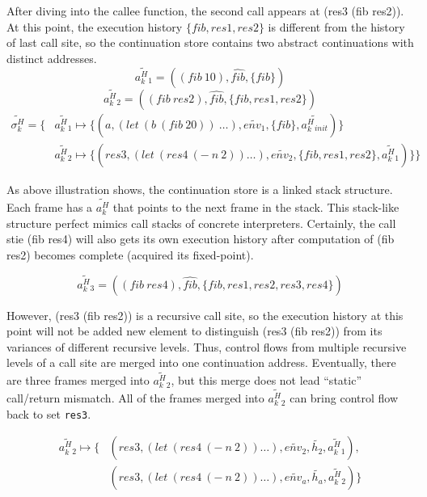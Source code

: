 \documentclass{article}
\begin{document}
After diving into the callee function, the second call appears at (res3 (fib res2)). At this point, the execution history $\{fib, res1, res2\}$ is different from the history of last call site, so the continuation store contains two abstract continuations with distinct addresses.
\[
\widetilde{a^H_k{}_1} = ((fib\ 10), \widehat{fib}, \{fib\})
\]
\[
\widetilde{a^H_k{}_2} = ((fib\ res2), \widehat{fib}, \{fib, res1, res2\})
\]
\[
\begin{aligned}
\label{eq:show-stack}
\widetilde{\sigma_k^H} = \{ {}& \widetilde{a^H_k{}_1} \mapsto \{(a, (let\ (b\ (fib\ 20))\ \dots), \widetilde{env_1}, \{fib\}, \widetilde{a^H_k{}_{init}})\}  {} \\
                              & \widetilde{a^H_k{}_2} \mapsto \{(res3, (let\ (res4\ (-\ n\ 2)) \dots), \widetilde{env_2}, \{fib, res1, res2\}, \widetilde{a^H_k{}_1})\} \}
\end{aligned}
\]

As above illustration shows, the continuation store is a linked stack structure. Each frame has a $\widetilde{a^H_k}$ that points to the next frame in the stack. This stack-like structure perfect mimics call stacks of concrete interpreters. Certainly, the call stie (fib res4) will also gets its own execution history after computation of (fib res2) becomes complete (acquired its fixed-point).

\[
\widetilde{a^H_k{}_3} = ((fib\ res4), \widehat{fib}, \{fib, res1, res2, res3, res4\})
\]

However, (res3 (fib res2)) is a recursive call site, so the execution history at this point will not be added new element to distinguish (res3 (fib res2)) from its variances of different recursive levels. Thus, control flows from multiple recursive levels of a call site are merged into one continuation address. Eventually, there are three frames merged into $\widetilde{a^H_k{}_2}$, but this merge does not lead ``static'' call/return mismatch. All of the frames merged into $\widetilde{a^H_k{}_2}$ can bring control flow back to set \verb|res3|.

\[
\begin{aligned}
\label{eq:show-stack}
\widetilde{a^H_k{}_2} \mapsto \{ {}& (res3, (let\ (res4\ (-\ n\ 2)) \dots), \widetilde{env_2}, \tilde{h_2}, \widetilde{a^H_k{}_1}), {} \\
                                 {}& (res3, (let\ (res4\ (-\ n\ 2)) \dots), \widetilde{env_a}, \tilde{h_a}, \widetilde{a^H_k{}_2}) \}
\end{aligned}
\]
\end{document}
